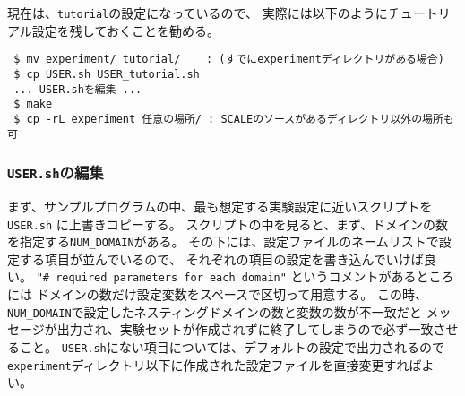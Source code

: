 現在は、\verb|tutorial|の設定になっているので、
実際には以下のようにチュートリアル設定を残しておくことを勧める。
\begin{verbatim}
 $ mv experiment/ tutorial/    : (すでにexperimentディレクトリがある場合)
 $ cp USER.sh USER_tutorial.sh
 ... USER.shを編集 ...
 $ make
 $ cp -rL experiment 任意の場所/ : SCALEのソースがあるディレクトリ以外の場所も可
\end{verbatim}


\subsubsection{\texttt{USER.sh}の編集}

まず、サンプルプログラムの中、最も想定する実験設定に近いスクリプトを
\verb|USER.sh| に上書きコピーする。
スクリプトの中を見ると、まず、ドメインの数を指定する\verb|NUM_DOMAIN|がある。
その下には、設定ファイルのネームリストで設定する項目が並んでいるので、
それぞれの項目の設定を書き込んでいけば良い。
\verb|"# required parameters for each domain"| というコメントがあるところには
ドメインの数だけ設定変数をスペースで区切って用意する。
この時、\verb|NUM_DOMAIN|で設定したネスティングドメインの数と変数の数が不一致だと
メッセージが出力され、実験セットが作成されずに終了してしまうので必ず一致させること。
\verb|USER.sh|にない項目については、デフォルトの設定で出力されるので
\verb|experiment|ディレクトリ以下に作成された設定ファイルを直接変更すればよい。

